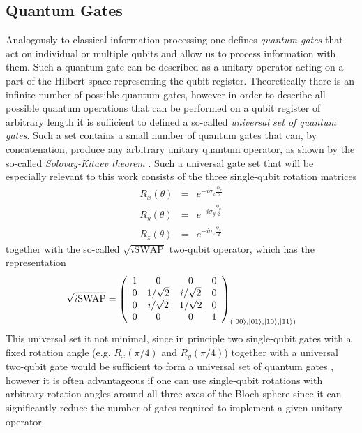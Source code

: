 \subsection{Quantum Gates}

Analogously to classical information processing one defines {\it quantum gates} that act on individual or multiple qubits and allow us to process information with them. Such a quantum gate can be described as a unitary operator acting on a part of the Hilbert space representing the qubit register. Theoretically there is an infinite number of possible quantum gates, however in order to describe all possible quantum operations that can be performed on a qubit register of arbitrary length it is sufficient to defined a so-called {\it universal set of quantum gates}. Such a set contains a small number of quantum gates that can, by concatenation, produce any arbitrary unitary quantum operator, as shown by the so-called {\it Solovay-Kitaev theorem} \citep{nielsen_quantum_2000,dawson_solovay-kitaev_2005}. Such a universal gate set that will be especially relevant to this work consists of the three single-qubit rotation matrices
%
\begin{eqnarray}
   R_x(\theta)  & = & e^{-i\sigma_x\frac{\phi_x}{2}} \\ 
   R_y(\theta)  & = & e^{-i\sigma_y\frac{\phi_y}{2}} \\ 
   R_z(\theta)  & = & e^{-i\sigma_z\frac{\phi_z}{2}} 
\label{eq:universal_single_qubit_gates}
\end{eqnarray}
%
together with the so-called $\sqrt{i\mathrm{SWAP}}$ two-qubit operator, which has the representation
%
\begin{equation}
\sqrt{i\mathrm{SWAP}} = \left( \begin{array}{cccc} 1 & 0 & 0 & 0 \\ 0 & 1/\sqrt{2} & i/\sqrt{2} & 0 \\ 0 & i/\sqrt{2} & 1/\sqrt{2} & 0 \\ 0 & 0 & 0 & 1  \end{array}  \right)_{(\left| 00 \right>,\left| 01 \right>,\left| 10 \right>,\left| 11 \right>)}
\end{equation}
%
This universal set it not minimal, since in principle two single-qubit gates with a fixed rotation angle (e.g. $R_x(\pi/4)$ and $R_y(\pi/4)$) together with a universal two-qubit gate would be sufficient to form a universal set of quantum gates \citep{dawson_solovay-kitaev_2005}, however it is often advantageous if one can use single-qubit rotations with arbitrary rotation angles around all three axes of the Bloch sphere since it can significantly reduce the number of gates required to implement a given unitary operator.

